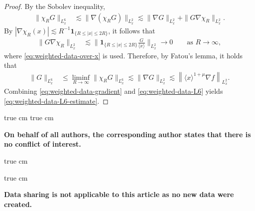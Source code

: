 \documentclass[11pt,twoside]{article}
\def\ls{\lesssim}
\theoremstyle{plain}
\theoremstyle{definition}
\theoremstyle{assumption}
\numberwithin{equation}{section}
\begin{document}
\begin{proof}
		By the Sobolev inequality,
		\begin{equation*}
			\label{eq:weighted-data-truncated-Sobolev}
			\begin{aligned}
				\|\chi_R G\|_{L^6_x}
				&\ls
				\|\nabla(\chi_R G)\|_{L^2_x}
				\ls
				\|\nabla G\|_{L^2_x}
				+
				\|G\nabla\chi_R\|_{L^2_x}.
			\end{aligned}
		\end{equation*}
		By $|\nabla\chi_R(x)|\ls R^{-1}
			\boldsymbol 1_{\{R\le|x|\le2R\}}$,
		it follows that
		\begin{equation*}
			\label{eq:weighted-data-cutoff-error}
			\begin{aligned}
				\|G\nabla\chi_R\|_{L^2_x}
				&\ls
				\big\|
				\boldsymbol 1_{\{R\le|x|\le2R\}}
				\frac{G}{\langle x\rangle}
				\big\|_{L^2_x}
				\longrightarrow0
				\qquad
				\text{as }R\to\infty,
			\end{aligned}
		\end{equation*}
		where \eqref{eq:weighted-data-over-x} is used.
		Therefore, by Fatou's lemma, it holds that
		\begin{equation}
			\label{eq:weighted-data-L6}
			\begin{aligned}
				\|G\|_{L^6_x}
				&\le
				\liminf_{R\to\infty}
				\|\chi_R G\|_{L^6_x}
				\ls
				\|\nabla G\|_{L^2_x}
				\ls
				\left\|
				\langle x\rangle^{1+\mu}\nabla f
				\right\|_{L^2_x}.
			\end{aligned}
		\end{equation}
		Combining \eqref{eq:weighted-data-gradient} and \eqref{eq:weighted-data-L6} yields \eqref{eq:weighted-data-L6-estimate}.
		
	\end{proof}
	
	
	
	
	
	
	
	 true cm
	{\bf \color{blue}{Conflict of interest}}
	 true cm
	
	{\bf On behalf of all authors, the corresponding author states that there is no conflict of interest.}
	
	 true cm
	
	
	{\bf \color{blue}{Data availability}}
	
	 true cm
	
	{\bf Data sharing is not applicable to this article as no new data were created.}
	
	
	
\end{document}
